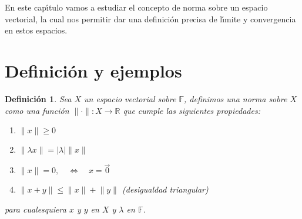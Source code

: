 \documentclass[12pt]{book}
\newtheorem{defn}{\bf Definición}[chapter]
\begin{document}
En este cap\'{\i}tulo vamos a estudiar el concepto de norma sobre un espacio vectorial, la cual nos 
permitir dar una definici\'on precisa de l\'{\i}mite y convergencia en estos espacios.

\section{Definici\'on y ejemplos}

\begin{defn} Sea $X$ un espacio  vectorial sobre $\mathbb{F}$, definimos una norma sobre $X$ 
 como una funci\'on  $\lVert\cdot\rVert :X\longrightarrow \mathbb{R}$ que cumple las siguientes 
propiedades:
\begin{enumerate}
\renewcommand{\labelenumi}{\textrm{\bf N}.\arabic{enumi}.}
\item $\lVert x\rVert \geq 0$
\item $\lVert \lambda x\rVert =\lvert\lambda\rvert\lVert x\rVert$
\item $\lVert x\rVert =0,\quad\Leftrightarrow\quad x=\vec 0$
\item $\lVert x + y \rVert \leq \lVert x\rVert +\lVert y\rVert$ (desigualdad triangular)
\end{enumerate}
para cualesquiera $x$ y $y$ en $X$ y $\lambda$ en $\mathbb{F}$.
\end{defn}
\end{document}
